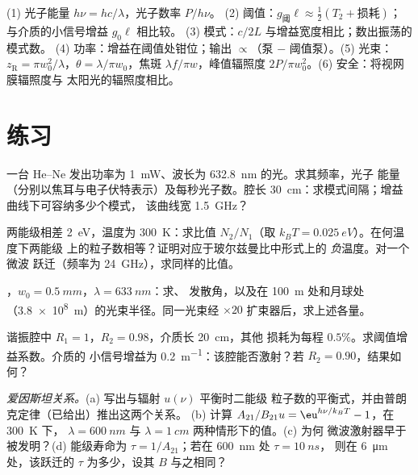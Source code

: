 \begin{method}[激光估算]\label{meth:b2:laser:method}
(1) 光子能量 $h\nu = hc/\lambda$，光子数率 $P/h\nu$。
(2) 阈值：$g_{\text{阈}}\ell \approx \tfrac12(T_2 + \text{损耗})$；
与介质的小信号增益 $g_0\ell$ 相比较。
(3) 模式：$c/2L$ 与增益宽度相比；数出振荡的模式数。
(4) 功率：增益在阈值处钳位；输出 $\propto$（泵 $-$
阈值泵）。(5) 光束：$z_{\text{R}} = \pi w_0^2/\lambda$，$\theta =
\lambda/\pi w_0$，焦斑 $\lambda f/\pi w$，峰值辐照度
$2P/\pi w_0^2$。(6) 安全：将视网膜辐照度与
太阳光的辐照度相比。
\end{method}

\section{练习}

\begin{exercise}[$\star$]\label{exo:b2:laser:1}
一台 He--Ne 发出功率为 \qty{1}{mW}、波长为 \qty{632.8}{nm} 的光。求其频率，光子
能量（分别以焦耳与电子伏特表示）及每秒光子数。腔长
\qty{30}{cm}：求模式间隔；增益曲线下可容纳多少个模式，
该曲线宽 \qty{1.5}{GHz}？
\end{exercise}

\begin{exercise}[$\star$]\label{exo:b2:laser:2}
两能级相差 \qty{2}{eV}，温度为 \qty{300}{K}：求比值 $N_2/N_1$（取
$k_BT = \qty{0.025}{eV}$）。在何温度下两能级
上的粒子数相等？证明对应于玻尔兹曼比中形式上的
\emph{负}温度。对一个微波
跃迁（频率为 \qty{24}{GHz}），求同样的比值。
\end{exercise}

\begin{exercise}[$\star$]\label{exo:b2:laser:3}
，$w_0 = \qty{0.5}{mm}$，$\lambda = \qty{633}{nm}$：求、
发散角，以及在 \qty{100}{m} 处和月球处
（\qty{3.8e8}{m}）的光束半径。同一光束经 $\times 20$ 扩束器后，求上述各量。
\end{exercise}

\begin{exercise}[$\star$]\label{exo:b2:laser:4}
谐振腔中 $R_1 = 1$，$R_2 = 0.98$，介质长 \qty{20}{cm}，其他
损耗为每程 $0.5\%$。求阈值增益系数。介质的
小信号增益为 \qty{0.2}{m^{-1}}：该腔能否激射？若
$R_2 = 0.90$，结果如何？
\end{exercise}

\begin{exercise}[$\star\star$]\label{exo:b2:laser:5}
\emph{爱因斯坦关系。}(a) 写出与辐射 $u(\nu)$ 平衡时二能级
粒子数的平衡式，并由普朗克定律（已给出）推出这两个关系。
(b) 计算
$A_{21}/B_{21}u = \eu^{h\nu/k_BT} - 1$，在 \qty{300}{K} 下，
$\lambda = \qty{600}{nm}$ 与 $\lambda = \qty{1}{cm}$ 两种情形下的值。(c) 为何
微波激射器早于被发明？(d) 能级寿命为
$\tau = 1/A_{21}$；若在 \qty{600}{nm} 处 $\tau = \qty{10}{ns}$，
则在 \qty{6}{\micro m} 处，该跃迁的 $\tau$ 为多少，设其 $B$ 与之相同？
\end{exercise}

